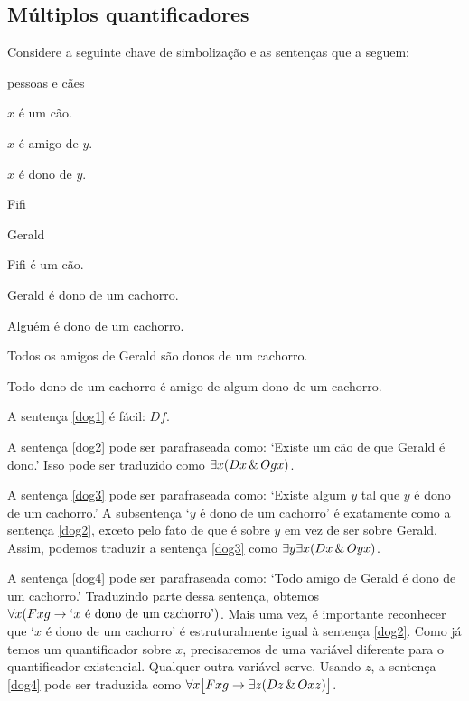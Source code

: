 \subsection{Múltiplos quantificadores}
Considere a seguinte chave de simbolização e as sentenças que a seguem:
\begin{ekey}
\item[UD:] pessoas e cães
\item[Dx:] $x$ é um cão.
\item[Fxy:] $x$ é amigo de $y$.
\item[Oxy:] $x$ é dono de $y$.
\item[f:] Fifi
\item[g:] Gerald
\end{ekey}

\begin{earg}
\item[\ex{dog1}] Fifi é um cão.
\item[\ex{dog2}] Gerald é dono de um cachorro.
\item[\ex{dog3}] Alguém é dono de um cachorro.
\item[\ex{dog4}] Todos os amigos de Gerald são donos de um cachorro.
\item[\ex{dog5}] Todo dono de um cachorro é amigo de algum dono de um cachorro.
\end{earg}

A sentença \ref{dog1} é fácil: $Df$.

A sentença \ref{dog2} pode ser parafraseada como: `Existe um cão de que Gerald é dono.' Isso pode ser traduzido como $\exists x(Dx \,\&\, Ogx)$.

A sentença \ref{dog3} pode ser parafraseada como: `Existe algum $y$ tal que $y$ é dono de um cachorro.' A subsentença `$y$ é dono de um cachorro' é exatamente como a sentença \ref{dog2}, exceto pelo fato de que é sobre $y$ em vez de ser sobre Gerald. Assim, podemos traduzir a sentença \ref{dog3} como $\exists y \exists x(Dx \,\&\, Oyx)$.

A sentença \ref{dog4} pode ser parafraseada como: `Todo amigo de Gerald é dono de um cachorro.' Traduzindo parte dessa sentença, obtemos $\forall x(Fxg \rightarrow\mbox{`$x$ é dono de um cachorro'})$. Mais uma vez, é importante reconhecer que `$x$ é dono de um cachorro' é estruturalmente igual à sentença \ref{dog2}. Como já temos um quantificador sobre $x$, precisaremos de uma variável diferente para o quantificador existencial. Qualquer outra variável serve. Usando $z$, a sentença \ref{dog4} pode ser traduzida como $\forall x\bigl[Fxg \rightarrow\exists z(Dz \,\&\, Oxz)\bigr]$.


